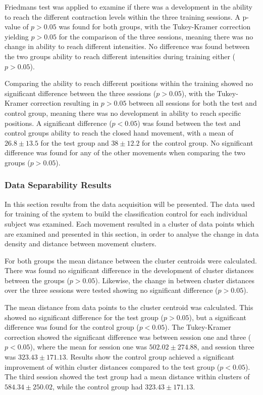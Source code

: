 \begin{multicols}{2}
Friedmans test was applied to examine if there was a development in the ability to reach the different contraction levels within the three training sessions. A p-value of $p > 0.05$ was found for both groups, with the Tukey-Kramer correction yielding $p > 0.05$ for the comparison of the three sessions, meaning there was no change in ability to reach different intensities. No difference was found between the two groups ability to reach different intensities during training either ($p > 0.05$).

Comparing the ability to reach different positions within the training showed no significant difference between the three sessions ($p > 0.05$), with the Tukey-Kramer correction resulting in $p > 0.05$ between all sessions for both the test and control group, meaning there was no development in ability to reach specific positions. A significant difference ($p < 0.05$) was found between the test and control groups ability to reach the closed hand movement, with a mean of $26.8 \pm13.5$ for the test group and $38 \pm12.2$ for the control group. No significant difference was found for any of the other movements when comparing the two groups ($p > 0.05$).

\subsubsection*{Data Separability Results}
In this section results from the data acquisition will be presented. The data used for training of the system to build the classification control for each individual subject was examined. Each movement resulted in a cluster of data points which are examined and presented in this section, in order to analyse the change in data density and distance between movement clusters.

For both groups the mean distance between the cluster centroids were calculated. There was found no significant difference in the development of cluster distances between the groups ($p > 0.05$). Likewise, the change in between cluster distances over the three sessions were tested showing no significant difference ($p > 0.05$).

The mean distance from data points to the cluster centroid was calculated. This showed no significant difference for the test group ($p > 0.05$), but a significant difference was found for the control group ($p < 0.05$). The Tukey-Kramer correction showed the significant difference was between session one and three ($p < 0.05$), where the mean for session one was $502.02 \pm 274.88$, and session three was $323.43 \pm 171.13$. Results show the control group achieved a significant improvement of within cluster distances compared to the test group ($p < 0.05$). The third session showed the test group had a mean distance within clusters of $584.34 \pm 250.02$, while the control group had $323.43 \pm 171.13$. 
\end{multicols}